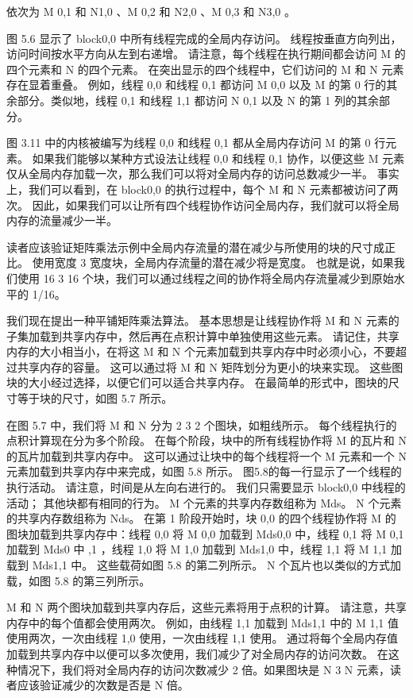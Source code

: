 依次为 M 0,1 和 N1,0 、M 0,2 和 N2,0 、M 0,3 和 N3,0 。

图 5.6 显示了 block0,0 中所有线程完成的全局内存访问。 线程按垂直方向列出，访问时间按水平方向从左到右递增。 请注意，每个线程在执行期间都会访问 M 的四个元素和 N 的四个元素。 在突出显示的四个线程中，它们访问的 M 和 N 元素存在显着重叠。 例如，线程 0,0 和线程 0,1 都访问 M 0,0 以及 M 的第 0 行的其余部分。类似地，线程 0,1 和线程 1,1 都访问 N 0,1 以及 N 的第 1 列的其余部分。

图 3.11 中的内核被编写为线程 0,0 和线程 0,1 都从全局内存访问 M 的第 0 行元素。 如果我们能够以某种方式设法让线程 0,0 和线程 0,1 协作，以便这些 M 元素仅从全局内存加载一次，那么我们可以将对全局内存的访问总数减少一半。 事实上，我们可以看到，在 block0,0 的执行过程中，每个 M 和 N 元素都被访问了两次。 因此，如果我们可以让所有四个线程协作访问全局内存，我们就可以将全局内存的流量减少一半。

读者应该验证矩阵乘法示例中全局内存流量的潜在减少与所使用的块的尺寸成正比。 使用宽度 3 宽度块，全局内存流量的潜在减少将是宽度。 也就是说，如果我们使用 16 3 16 个块，我们可以通过线程之间的协作将全局内存流量减少到原始水平的 1/16。

我们现在提出一种平铺矩阵乘法算法。 基本思想是让线程协作将 M 和 N 元素的子集加载到共享内存中，然后再在点积计算中单独使用这些元素。 请记住，共享内存的大小相当小，在将这 M 和 N 个元素加载到共享内存中时必须小心，不要超过共享内存的容量。 这可以通过将 M 和 N 矩阵划分为更小的块来实现。 这些图块的大小经过选择，以便它们可以适合共享内存。 在最简单的形式中，图块的尺寸等于块的尺寸，如图 5.7 所示。

在图 5.7 中，我们将 M 和 N 分为 2 3 2 个图块，如粗线所示。 每个线程执行的点积计算现在分为多个阶段。 在每个阶段，块中的所有线程协作将 M 的瓦片和 N 的瓦片加载到共享内存中。 这可以通过让块中的每个线程将一个 M 元素和一个 N 元素加载到共享内存中来完成，如图 5.8 所示。 图5.8的每一行显示了一个线程的执行活动。 请注意，时间是从左向右进行的。 我们只需要显示 block0,0 中线程的活动； 其他块都有相同的行为。 M 个元素的共享内存数组称为 Mds。 N 个元素的共享内存数组称为 Nds。 在第 1 阶段开始时，块 0,0 的四个线程协作将 M 的图块加载到共享内存中：线程 0,0 将 M 0,0 加载到 Mds0,0 中，线程 0,1 将 M 0,1 加载到 Mds0 中 ,1 ，线程 1,0 将 M 1,0 加载到 Mds1,0 中，线程 1,1 将 M 1,1 加载到 Mds1,1 中。 这些载荷如图 5.8 的第二列所示。 N 个瓦片也以类似的方式加载，如图 5.8 的第三列所示。

M 和 N 两个图块加载到共享内存后，这些元素将用于点积的计算。 请注意，共享内存中的每个值都会使用两次。 例如，由线程 1,1 加载到 Mds1,1 中的 M 1,1 值使用两次，一次由线程 1,0 使用，一次由线程 1,1 使用。 通过将每个全局内存值加载到共享内存中以便可以多次使用，我们减少了对全局内存的访问次数。 在这种情况下，我们将对全局内存的访问次数减少 2 倍。如果图块是 N 3 N 元素，读者应该验证减少的次数是否是 N 倍。

